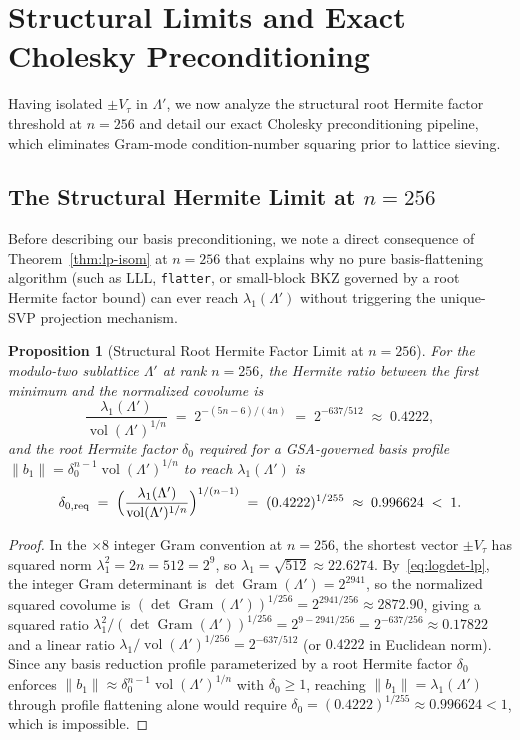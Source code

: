 \documentclass[11pt,a4paper]{article}
\newtheorem{proposition}[theorem]{Proposition}
\theoremstyle{definition}
\newcommand{\Lp}{\Lambda'}
\newcommand{\Vt}{V_\tau}
\newcommand{\vol}{\operatorname{vol}}
\newcommand{\Gram}{\operatorname{Gram}}
\begin{document}
\section{Structural Limits and Exact Cholesky Preconditioning}
\label{sec:precond}

Having isolated $\pm\Vt$ in $\Lp$, we now analyze the structural root Hermite factor threshold at $n=256$ and detail our exact Cholesky preconditioning pipeline, which eliminates Gram-mode condition-number squaring prior to lattice sieving.

\subsection{The Structural Hermite Limit at \texorpdfstring{$n=256$}{n=256}}
Before describing our basis preconditioning, we note a direct consequence of Theorem~\ref{thm:lp-isom} at $n=256$ that explains why no pure basis-flattening algorithm (such as LLL, \texttt{flatter}, or small-block BKZ governed by a root Hermite factor bound) can ever reach $\lambda_1(\Lp)$ without triggering the unique-SVP projection mechanism.

\begin{proposition}[Structural Root Hermite Factor Limit at $n=256$]\label{prop:structural-limit}
For the modulo-two sublattice $\Lp$ at rank $n=256$, the Hermite ratio between the first minimum and the normalized covolume is
\[
  \frac{\lambda_1(\Lp)}{\vol(\Lp)^{1/n}} \;=\; 2^{-(5n-6)/(4n)} \;=\; 2^{-637/512} \;\approx\; 0.4222,
\]
and the root Hermite factor $\delta_0$ required for a GSA-governed basis profile $\|b_1\| = \delta_0^{n-1}\vol(\Lp)^{1/n}$ to reach $\lambda_1(\Lp)$ is
\begin{equation}\label{eq:rhf-limit}
  \delta_{0,\mathrm{req}} \;=\; \Bigl(\frac{\lambda_1(\Lp)}{\vol(\Lp)^{1/n}}\Bigr)^{1/(n-1)} \;=\; (0.4222)^{1/255} \;\approx\; 0.996624 \;<\; 1.
\end{equation}
\end{proposition}

\begin{proof}
In the $\times 8$ integer Gram convention at $n=256$, the shortest vector $\pm\Vt$ has squared norm $\lambda_1^2 = 2n = 512 = 2^9$, so $\lambda_1 = \sqrt{512} \approx 22.6274$. By~\eqref{eq:logdet-lp}, the integer Gram determinant is $\det \Gram(\Lp) = 2^{2941}$, so the normalized squared covolume is $(\det \Gram(\Lp))^{1/256} = 2^{2941/256} \approx 2872.90$, giving a squared ratio $\lambda_1^2 / (\det \Gram(\Lp))^{1/256} = 2^{9 - 2941/256} = 2^{-637/256} \approx 0.17822$ and a linear ratio $\lambda_1 / \vol(\Lp)^{1/256} = 2^{-637/512}$ (or $0.4222$ in Euclidean norm). Since any basis reduction profile parameterized by a root Hermite factor $\delta_0$ enforces $\|b_1\| \approx \delta_0^{n-1}\vol(\Lp)^{1/n}$ with $\delta_0 \ge 1$, reaching $\|b_1\| = \lambda_1(\Lp)$ through profile flattening alone would require $\delta_0 = (0.4222)^{1/255} \approx 0.996624 < 1$, which is impossible.
\end{proof}
\end{document}
